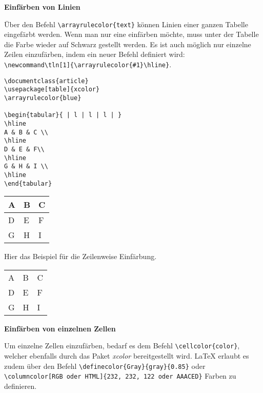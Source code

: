 \bigskip

\textbf{Einfärben von Linien}

Über den Befehl \verb|\arrayrulecolor{text}| können Linien einer ganzen Tabelle eingefärbt werden. Wenn man nur eine einfärben möchte, muss unter der Tabelle die Farbe wieder auf Schwarz gestellt werden. Es ist auch möglich nur einzelne Zeilen einzufärben, indem ein neuer Befehl definiert wird:\\ \verb|\newcommand\tln[1]{\arrayrulecolor{#1}\hline}|.

\begin{lstlisting}[style=Latex,caption={Einfache Tabelle mit Einfärbung der Linien},label=lst:tab8]
\documentclass{article}
\usepackage[table]{xcolor}
\arrayrulecolor{blue}

\begin{tabular}{ | l | l | l | }
\hline
A & B & C \\
\hline
D & E & F\\
\hline
G & H & I \\
\hline
\end{tabular}

\end{lstlisting}

	\begin{tabular}{ | l | l | l | }
		\hline
		A & B & C \\
		\hline
		D & E & F\\
		\hline
		G & H & I \\
		\hline
	\end{tabular}

Hier das Beispiel für die Zeilenweise Einfärbung.
\newcommand\tln[1]{\arrayrulecolor{#1}\hline}
\begin{tabular}{ | l | l | l | }
	\hline
	A & B & C \\ 
	\tln{red}
	D & E & F \\ 
	\hline
	G & H & I \\
	\hline
\end{tabular}

\bigskip

\textbf{Einfärben von einzelnen Zellen}

Um einzelne Zellen einzufärben, bedarf es dem Befehl \verb|\cellcolor{color}|, welcher ebenfalls durch das Paket \emph{xcolor} bereitgestellt wird. \LaTeX{} erlaubt es zudem über den Befehl \verb|\definecolor{Gray}{gray}{0.85}| oder\\ \verb|\columncolor[RGB oder HTML]{232, 232, 122 oder AAACED}| Farben zu definieren. 

